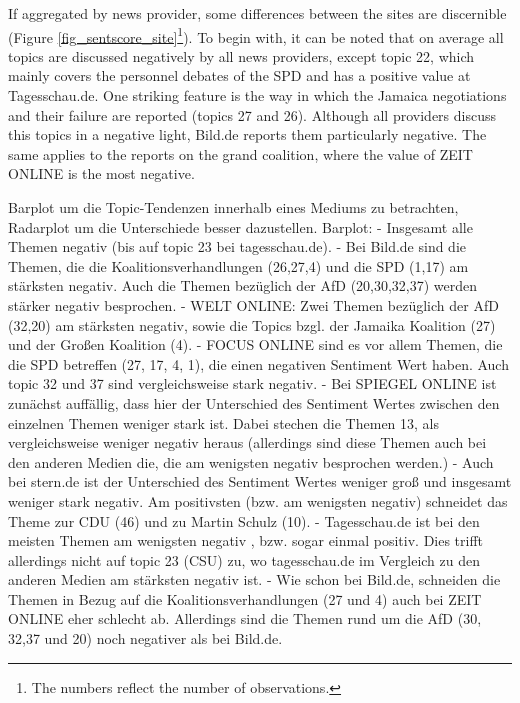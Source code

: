 \documentclass[12pt,a4paper,notitlepage]{article}
\begin{document}
If aggregated by news provider, some differences between the sites are discernible (Figure \ref{fig_sentscore_site}\footnote{The numbers reflect the number of observations.}). To begin with, it can be noted that on average all topics are discussed negatively by all news providers, except topic 22, which mainly covers the personnel debates of the SPD and has a positive value at Tagesschau.de. One striking feature is the way in which the Jamaica negotiations and their failure are reported (topics 27 and 26). Although all providers discuss this topics in a negative light, Bild.de reports them particularly negative. The same applies to the reports on the grand coalition, where the value of ZEIT ONLINE is the most negative. 

Barplot um die Topic-Tendenzen innerhalb eines Mediums zu betrachten, Radarplot um die Unterschiede besser dazustellen.
Barplot: 
- Insgesamt alle Themen negativ (bis auf topic 23 bei tagesschau.de). 
- Bei Bild.de sind die Themen, die die Koalitionsverhandlungen (26,27,4) und die SPD (1,17) am stärksten negativ. Auch die Themen bezüglich der AfD (20,30,32,37) werden stärker negativ besprochen.
- WELT ONLINE: Zwei Themen bezüglich der AfD (32,20) am stärksten negativ, sowie die Topics bzgl. der Jamaika Koalition (27) und der Großen Koalition (4).
- FOCUS ONLINE sind es vor allem Themen, die die SPD betreffen (27, 17, 4, 1), die einen negativen Sentiment Wert haben. Auch topic 32 und 37 sind vergleichsweise stark negativ.
- Bei SPIEGEL ONLINE ist zunächst auffällig, dass hier der Unterschied des Sentiment Wertes zwischen den einzelnen Themen weniger stark ist. Dabei stechen die Themen 13, als vergleichsweise weniger negativ heraus (allerdings sind diese Themen auch bei den anderen Medien die, die am wenigsten negativ besprochen werden.) 
- Auch bei stern.de ist der Unterschied des Sentiment Wertes weniger groß und insgesamt weniger stark negativ. Am positivsten (bzw. am wenigsten negativ) schneidet das Theme zur CDU (46) und zu Martin Schulz (10).
- Tagesschau.de ist bei den meisten Themen am wenigsten negativ , bzw. sogar einmal positiv. Dies trifft allerdings nicht auf topic 23 (CSU) zu, wo tagesschau.de im Vergleich zu den anderen Medien am stärksten negativ ist.
- Wie schon bei Bild.de, schneiden die Themen in Bezug auf die Koalitionsverhandlungen (27 und 4) auch bei ZEIT ONLINE eher schlecht ab.  Allerdings sind die Themen rund um die AfD (30, 32,37 und 20) noch negativer als bei Bild.de. 
\end{document}

